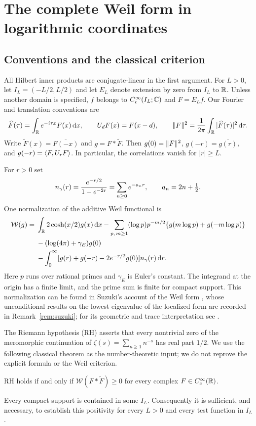\section{The complete Weil form in logarithmic coordinates}\label{sec:weil}
\subsection{Conventions and the classical criterion}
All Hilbert inner products are conjugate-linear in the first argument.
For $L>0$, let $I_L=(-L/2,L/2)$ and let $E_L$ denote extension by zero
from $I_L$ to $\mathbb R$. Unless another domain is specified, $f$ belongs to
$C_c^\infty(I_L;\mathbb C)$ and $F=E_Lf$. Our Fourier and translation
conventions are
\begin{equation}\label{eq:fourier}
 \widehat F(\tau)=\int_\mathbb R e^{-i\tau x}F(x)\,\mathrm d x,
 \qquad U_dF(x)=F(x-d),\qquad
 \lVert F\rVert^2=\frac1{2\pi}\int_\mathbb R|\widehat F(\tau)|^2\,\mathrm d\tau.
\end{equation}
Write $\widetilde F(x)=\overline{F(-x)}$ and $g=F*\widetilde F$.
Then $g(0)=\lVert F\rVert^2$, $g(-r)=\overline{g(r)}$, and
$g(-r)=\langle F,U_rF\rangle$. In particular, the correlations vanish for $|r|\geq L$.

For $r>0$ set
\begin{equation}\label{eq:gamma-kernel}
 n_{\gamma}(r)=\frac{e^{-r/2}}{1-e^{-2r}}
 =\sum_{n\geq0}e^{-a_nr},\qquad a_n=2n+\tfrac12.
\end{equation}
One normalization of the additive Weil functional is
\begin{align}
 \mathcal W(g)={}&\int_\mathbb R 2\cosh(x/2)g(x)\,\mathrm d x
 -\sum_{p,\,m\geq1}(\log p)p^{-m/2}
       \{g(m\log p)+g(-m\log p)\}\notag\\
 &-(\log(4\pi)+\gamma_E)g(0)\notag\\
 &-\int_0^\infty
       [g(r)+g(-r)-2e^{-r/2}g(0)]n_{\gamma}(r)\,\mathrm d r.
 \label{eq:weil-functional}
\end{align}
Here $p$ runs over rational primes and $\gamma_E$ is Euler's constant.
The integrand at the origin has a finite limit, and the prime sum is
finite for compact support. This normalization can be found in
Suzuki's account of the Weil form \cite[Section 1.1]{Suzuki}, whose
unconditional results on the lowest eigenvalue of the localized form are
recorded in Remark~\ref{rem:suzuki}; for its geometric and trace interpretation
see \cite{CCM}.

The Riemann hypothesis (RH) asserts that every nontrivial zero of the
meromorphic continuation of $\zeta(s)=\sum_{n\geq1}n^{-s}$ has real
part $1/2$. We use the following classical theorem as the number-theoretic
input; we do not reprove the explicit formula or the Weil criterion.
\begin{theorem}\label{thm:weil}
RH holds if and only if $\mathcal W(F*\widetilde F)\geq0$ for every
complex $F\in C_c^\infty(\mathbb R)$.
\end{theorem}
Every compact support is contained in some $I_L$. Consequently it is
sufficient, and necessary, to establish this positivity for every $L>0$
and every test function in $I_L$.

